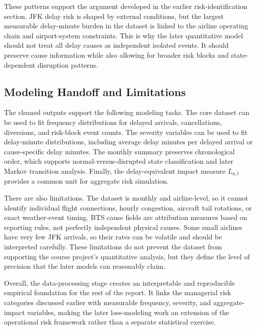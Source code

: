 \documentclass[11pt]{article}
\numberwithin{figure}{section}
\numberwithin{table}{section}
\begin{document}
These patterns support the argument developed in the earlier risk-identification section. JFK delay risk is shaped by external conditions, but the largest measurable delay-minute burden in the dataset is linked to the airline operating chain and airport-system constraints. This is why the later quantitative model should not treat all delay causes as independent isolated events. It should preserve cause information while also allowing for broader risk blocks and state-dependent disruption patterns.

\subsection{Modeling Handoff and Limitations}

The cleaned outputs support the following modeling tasks. The core dataset can be used to fit frequency distributions for delayed arrivals, cancellations, diversions, and risk-block event counts. The severity variables can be used to fit delay-minute distributions, including average delay minutes per delayed arrival or cause-specific delay minutes. The monthly summary preserves chronological order, which supports normal-versus-disrupted state classification and later Markov transition analysis. Finally, the delay-equivalent impact measure \(L_{a,t}\) provides a common unit for aggregate risk simulation.

There are also limitations. The dataset is monthly and airline-level, so it cannot identify individual flight connections, hourly congestion, aircraft tail rotations, or exact weather-event timing. BTS cause fields are attribution measures based on reporting rules, not perfectly independent physical causes. Some small airlines have very few JFK arrivals, so their rates can be volatile and should be interpreted carefully. These limitations do not prevent the dataset from supporting the course project's quantitative analysis, but they define the level of precision that the later models can reasonably claim.

Overall, the data-processing stage creates an interpretable and reproducible empirical foundation for the rest of the report. It links the managerial risk categories discussed earlier with measurable frequency, severity, and aggregate-impact variables, making the later loss-modeling work an extension of the operational risk framework rather than a separate statistical exercise.
\end{document}

